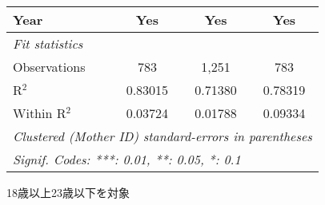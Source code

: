 \documentclass{article}
\begin{document}
\begin{landscape}
\begin{threeparttable}[b]
\begin{tabular}{lccc}
      Year                                                & Yes                 & Yes          & Yes\\  
      \midrule
      \emph{Fit statistics}\\
      Observations                                        & 783                 & 1,251        & 783\\  
      R$^2$                                               & 0.83015             & 0.71380      & 0.78319\\  
      Within R$^2$                                        & 0.03724             & 0.01788      & 0.09334\\  
      \midrule \midrule
      \multicolumn{4}{l}{\emph{Clustered (Mother ID) standard-errors in parentheses}}\\
      \multicolumn{4}{l}{\emph{Signif. Codes: ***: 0.01, **: 0.05, *: 0.1}}\\
   \end{tabular}
   
   \begin{tablenotes}\item 18歳以上23歳以下を対象
   \end{tablenotes}
\end{threeparttable}
\par\endgroup


\end{landscape}
\end{document}
